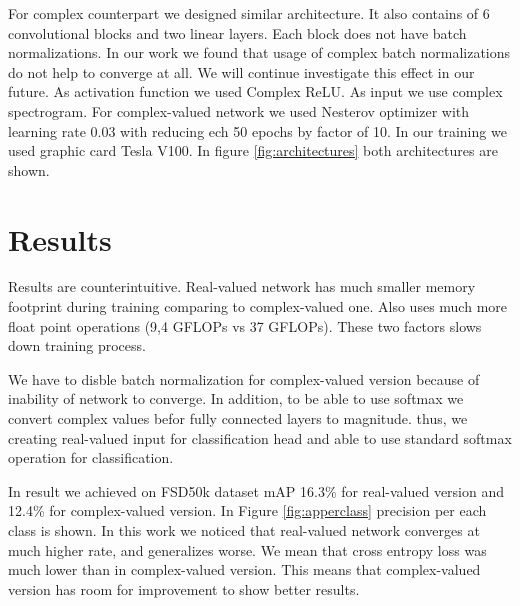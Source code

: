 \documentclass{article}
\begin{document}
For complex counterpart we designed similar architecture. It also contains of 6 convolutional blocks 
and two linear layers. Each block does not have batch normalizations. In our work we found that usage of 
complex batch normalizations \citep{Trabelsi2017} do not help to converge at all. We will continue investigate
 this effect in our future. As activation function we used Complex ReLU\citep{Trabelsi2017}. As input we use complex spectrogram.
 For complex-valued network we used Nesterov optimizer with learning rate 0.03 with reducing ech 50 epochs by factor of 10.
In our training we used graphic card Tesla V100. In figure \ref{fig:architectures} both architectures are shown. 

\section{Results}
Results are counterintuitive. Real-valued network has much smaller memory footprint during training comparing to complex-valued one.
Also uses much more float point operations (9,4 GFLOPs vs 37 GFLOPs). These two factors slows down training process.

We have to disble batch normalization for complex-valued version because of inability of network to converge. In addition, to 
be able to use softmax we convert complex values befor fully connected layers to magnitude. thus, we creating 
real-valued input for classification head and able to use standard softmax operation for classification.

In result we achieved on FSD50k dataset mAP 16.3\% for real-valued version and 12.4\% for complex-valued version. 
In Figure \ref{fig:apperclass} precision per each class is shown. In this work we noticed 
that real-valued network converges at much higher rate, and generalizes worse. We mean that cross entropy loss was much lower than in complex-valued version.
This means that complex-valued version has room for improvement to show better results.
\end{document}
